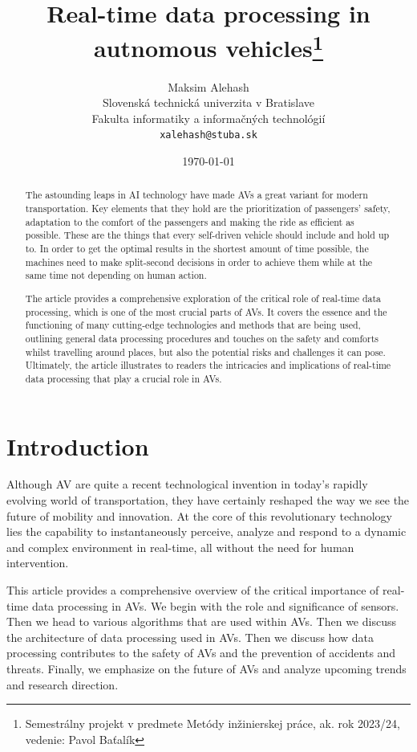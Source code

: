 \documentclass[10pt,oneside,english,a4paper]{article}
\title{Real-time data processing in autnomous vehicles\thanks{Semestrálny projekt v predmete Metódy inžinierskej práce, ak. rok 2023/24, vedenie: Pavol Baťalík}} %
\author{Maksim Alehash\\[2pt]
	{\small Slovenská technická univerzita v Bratislave}\\
	{\small Fakulta informatiky a informačných technológií}\\
	{\small \texttt{xalehash@stuba.sk}}
	}
\date{\small\today} %
\begin{document}
\maketitle

\begin{abstract}
The astounding leaps in AI technology have made AVs a great variant for modern transportation. Key elements that they hold are the prioritization of passengers' safety, adaptation to the comfort of the passengers and making the ride as efficient as possible. These are the things that every self-driven vehicle should include and hold up to. In order to get the optimal results in the shortest amount of time possible, the machines need to make split-second decisions in order to achieve them while at the same time not depending on human action. 
\par The article provides a comprehensive exploration of the critical role of real-time data processing, which is one of the most crucial parts of AVs. It covers the essence and the functioning of many cutting-edge technologies and methods that are being used, outlining general data processing procedures and touches on the safety and comforts whilst travelling around places, but also the potential risks and challenges it can pose. Ultimately, the article illustrates to readers the intricacies and implications of real-time data processing that play a crucial role in AVs.

\end{abstract}

\newpage\section{Introduction}

\indent Although AV are quite a recent technological invention in today's rapidly evolving world of transportation, they have certainly reshaped the way we see the future of mobility and innovation. At the core of this revolutionary technology lies the capability to instantaneously perceive, analyze and respond to a dynamic and complex environment in real-time, all without the need for human intervention. 
\par This article provides a comprehensive overview of the critical importance of real-time data processing in AVs. We begin with the role and significance of sensors. 
Then we head to various algorithms that are used within AVs. Then we discuss the architecture of data processing used in AVs. Then we discuss how data processing contributes to the safety of AVs and the prevention of accidents and threats. Finally, we emphasize on the future of AVs and analyze upcoming trends and research direction.
\end{document}
